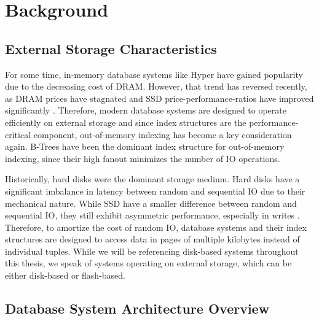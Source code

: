 \chapter{Background}


\section{External Storage Characteristics}
For some time, in-memory database systems like Hyper \cite{kemper2011hyper} have gained popularity due to the decreasing cost of \ac{DRAM}.
However, that trend has reversed recently, as \ac{DRAM} prices have stagnated \cite{haas2023modern} and \ac{SSD} price-performance-ratios have improved significantly \cite{leis2024leanstore}.
Therefore, modern database systems are designed to operate efficiently on external storage and since index structures are the performance-critical component, out-of-memory indexing has become a key consideration again.
B-Trees have been the dominant index structure for out-of-memory indexing, since their high fanout minimizes the number of \ac{IO} operations.

Historically, hard disks were the dominant storage medium.
Hard disks have a significant imbalance in latency between random and sequential \ac{IO} due to their mechanical nature.
While \ac{SSD} have a smaller difference between random and sequential \ac{IO}, they still exhibit asymmetric performance, especially in writes \cite{haas2023modern}.
Therefore, to amortize the cost of random \ac{IO}, database systems and their index structures are designed to access data in pages of multiple kilobytes instead of individual tuples.
While we will be referencing disk-based systems throughout this thesis, we speak of systems operating on external storage, which can be either disk-based or flash-based.


\section{Database System Architecture Overview}


